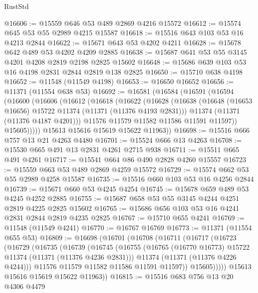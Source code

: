 \begin{lexlean}{RustStd}
\begin{coremodule}
@16606 := @15559 @646 @53 @489 @2869 @4216 @15572
@16612 := @15574 @645 @53 @55 @2989 @4215 @15587
@16618 := @15516 @643 @103 @53 @16 @4213 @2844
@16622 := @15671 @643 @53 @4202 @4211
@16628 := @15678 @642 @489 @53 @4202 @4209 @2885
@16638 := @15687 @641 @53 @55 @3145 @4201 @4208 @2819 @2198 @2825 @15602
@16648 := @15686 @639 @103 @53 @16 @4198 @2831 @2844 @2819 @138 @2825
@16650 := @15710 @638 @4198
@16652 := @11548 (@11549 @4198)
@16653 := @16650 @16652
@16656 := @11371 (@11554 @638 @53)
@16692 := @16581
    (@16584
      (@16591
        (@16594
          (@16600
            (@16606
              (@16612
                (@16618
                  (@16622
                    (@16628
                      (@16638
                        (@16648 (@16653 @16656) @15722 @11374 (@11371 (@11376 @4193 @2831)))
                        @11374
                        (@11371 (@11376 @4187 @4201)))
                      @11576
                      @11579
                      @11582
                      @11586
                      @11591
                      @11597))
                  @15605)))))
        @15613
        @15616
        @15619
        @15622
        @11963))
@16698 := @15516 @666 @757 @13 @21 @4263 @4480
@16701 := @15524 @666 @13 @4263
@16708 := @15530 @665 @491 @13 @2831 @4261 @2715 @938
@16711 := @15511 @665 @491 @4261
@16717 := @15541 @664 @86 @490 @2828 @4260 @15557
@16723 := @15559 @663 @53 @489 @2869 @4259 @15572
@16729 := @15574 @662 @53 @55 @2989 @4258 @15587
@16735 := @15516 @660 @103 @53 @16 @4256 @2844
@16739 := @15671 @660 @53 @4245 @4254
@16745 := @15678 @659 @489 @53 @4245 @4252 @2885
@16755 := @15687 @658 @53 @55 @3145 @4244 @4251 @2819 @4225 @2825 @15602
@16765 := @15686 @656 @103 @53 @16 @4241 @2831 @2844 @2819 @4235 @2825
@16767 := @15710 @655 @4241
@16769 := @11548 (@11549 @4241)
@16770 := @16767 @16769
@16773 := @11371 (@11554 @655 @53)
@16809 := @16698
    (@16701
      (@16708
        (@16711
          (@16717
            (@16723
              (@16729
                (@16735
                  (@16739
                    (@16745
                      (@16755
                        (@16765 (@16770 @16773) @15722 @11374 (@11371 (@11376 @4236 @2831)))
                        @11374
                        (@11371 (@11376 @4226 @4244)))
                      @11576
                      @11579
                      @11582
                      @11586
                      @11591
                      @11597))
                  @15605)))))
        @15613
        @15616
        @15619
        @15622
        @11963))
@16815 := @15516 @683 @756 @13 @20 @4306 @4479

\end{coremodule}
\end{lexlean}

